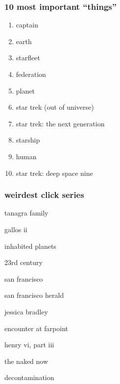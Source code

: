 \documentclass{beamer}
\begin{document}
\begin{frame}
  \frametitle{10 most important ``things''}
  \begin{enumerate}
    \item<10-> captain
    \item<9-> earth
    \item<8-> starfleet
    \item<7-> federation
    \item<6-> planet
    \item<5-> star trek (out of universe)
    \item<4-> star trek: the next generation
    \item<3-> starship
    \item<2-> human
    \item<1-> star trek: deep space nine
  \end{enumerate}
\end{frame}

\begin{frame}
  \frametitle{weirdest click series}

  tanagra family

  gallos ii

  inhabited planets

  23rd century

  san francisco

  san francisco herald

  jessica bradley

  encounter at farpoint

  henry vi, part iii

  the naked now

  decontamination

\end{frame}
\end{document}
